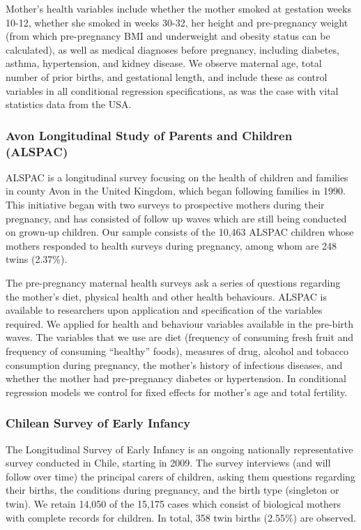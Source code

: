 \documentclass{nature}
\begin{document}
\begin{linenumbers}
Mother's health variables include whether the mother smoked at gestation weeks 10-12, whether she smoked in weeks 30-32, her height and pre-pregnancy weight (from which pre-pregnancy BMI and underweight and obesity status can be calculated), as well as medical diagnoses before pregnancy,  including diabetes, asthma, hypertension, and kidney disease.  We observe maternal age, total number of prior births, and gestational length, and include these as control variables in all conditional regression specifications, as was the case with vital statistics data from the USA.  

\subsubsection{Avon Longitudinal Study of Parents and Children (ALSPAC)}
ALSPAC is a longitudinal survey focusing on the health of children and families in county Avon in the United Kingdom, which began following families in 1990.  This initiative began with two surveys to prospective mothers during their pregnancy, and has consisted of follow up waves which are still being conducted on grown-up children.  Our sample consists of the 10,463 ALSPAC children whose mothers responded to health surveys during pregnancy, among whom are 248 twins (2.37\%).


The pre-pregnancy maternal health surveys ask a series of questions regarding the mother's diet, physical health and other health behaviours.  ALSPAC is available to researchers upon application and specification of the variables required. We applied for health and behaviour variables available in the pre-birth waves. The variables that we use are diet (frequency of consuming fresh fruit and frequency of consuming ``healthy'' foods), measures of drug, alcohol and tobacco consumption during pregnancy, the mother's history of infectious diseases, and whether the mother had pre-pregnancy diabetes or hypertension. In conditional regression models we control for fixed effects for mother's age and total fertility.

\subsubsection{Chilean Survey of Early Infancy}

The Longitudinal Survey of Early Infancy is an ongoing nationally representative survey conducted in Chile, starting in 2009.  The survey interviews (and will follow over time) the principal carers of children, asking them questions regarding their births, the conditions during pregnancy, and the birth type (singleton or twin). We retain 14,050 of the 15,175 cases which consist of biological mothers with complete records for children. In total, 358 twin births (2.55\%) are observed.


\end{linenumbers}
\end{document}
